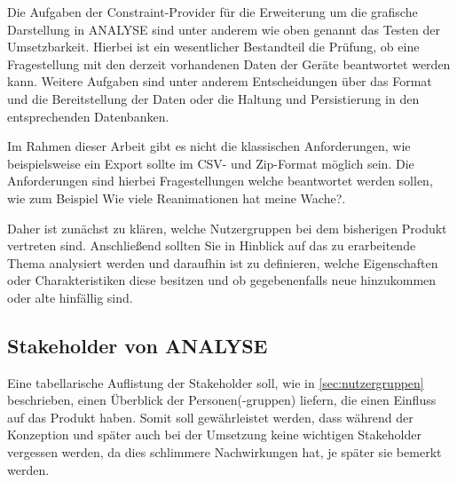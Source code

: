Die Aufgaben der Constraint-Provider für die Erweiterung um die grafische Darstellung in \gls{ANALYSE} sind unter anderem wie oben genannt das Testen der Umsetzbarkeit.
Hierbei ist ein wesentlicher Bestandteil die Prüfung, ob eine Fragestellung mit den derzeit vorhandenen Daten der Geräte beantwortet werden kann.
Weitere Aufgaben sind unter anderem Entscheidungen über das Format und die Bereitstellung der Daten oder die Haltung und Persistierung in den entsprechenden Datenbanken.

Im Rahmen dieser Arbeit gibt es nicht die klassischen Anforderungen, wie beispielsweise \glqq ein Export sollte im CSV- und Zip-Format möglich sein\grqq. Die Anforderungen sind hierbei Fragestellungen welche beantwortet werden sollen, wie zum Beispiel \glqq Wie viele Reanimationen hat meine Wache?\grqq.

Daher ist zunächst zu klären, welche Nutzergruppen bei dem bisherigen Produkt vertreten sind.
Anschließend sollten Sie in Hinblick auf das zu erarbeitende Thema analysiert werden und daraufhin ist zu definieren, welche Eigenschaften oder Charakteristiken diese besitzen und ob gegebenenfalls neue hinzukommen oder alte hinfällig sind. 

\subsection{Stakeholder von \acrlong*{ANALYSE}}
\label{subsec:stakeholder}
Eine tabellarische Auflistung der Stakeholder soll, wie in \ref{sec:nutzergruppen} beschrieben, einen Überblick der Personen(-gruppen) liefern, die einen Einfluss auf das Produkt haben.
Somit soll gewährleistet werden, dass während der Konzeption und später auch bei der Umsetzung keine wichtigen Stakeholder vergessen werden, da dies schlimmere Nachwirkungen hat, je später sie bemerkt werden.


